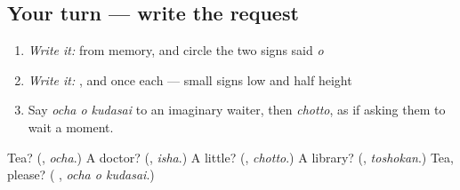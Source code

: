 \subsection*{Your turn — write the request}
\begin{enumerate}
\raggedright
  \item \emph{Write it:} \textbf{ } from memory, and circle the two signs said \emph{o}
  \item \emph{Write it:} \textbf{}, \textbf{} and \textbf{} once each — small signs low and half height
  \item Say \emph{ocha o kudasai} to an imaginary waiter, then \emph{chotto}, as if asking them to wait a moment.
\end{enumerate}

\begin{tcolorbox}[breakable,colback=teal!4,colframe=teal!35!black,title={Before you move on}]
Tea? (\textbf{}, \emph{ocha}.) A doctor? (\textbf{}, \emph{isha}.) A little? (\textbf{}, \emph{chotto}.) A library? (\textbf{}, \emph{toshokan}.) Tea, please? (\textbf{ }, \emph{ocha o kudasai}.)
\end{tcolorbox}
